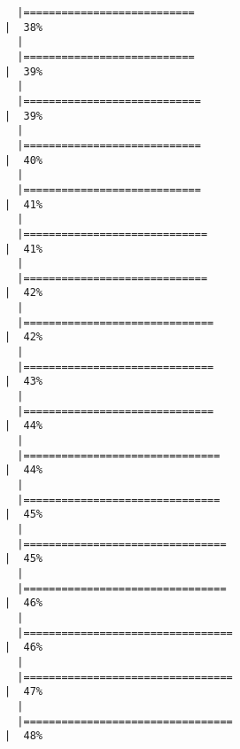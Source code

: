 \documentclass[12pt]{article}
\begin{document}
\begin{verbatim}
  |===========================                                           |  38%
  |                                                                            
  |===========================                                           |  39%
  |                                                                            
  |============================                                          |  39%
  |                                                                            
  |============================                                          |  40%
  |                                                                            
  |============================                                          |  41%
  |                                                                            
  |=============================                                         |  41%
  |                                                                            
  |=============================                                         |  42%
  |                                                                            
  |==============================                                        |  42%
  |                                                                            
  |==============================                                        |  43%
  |                                                                            
  |==============================                                        |  44%
  |                                                                            
  |===============================                                       |  44%
  |                                                                            
  |===============================                                       |  45%
  |                                                                            
  |================================                                      |  45%
  |                                                                            
  |================================                                      |  46%
  |                                                                            
  |=================================                                     |  46%
  |                                                                            
  |=================================                                     |  47%
  |                                                                            
  |=================================                                     |  48%

\end{verbatim}
\end{document}
